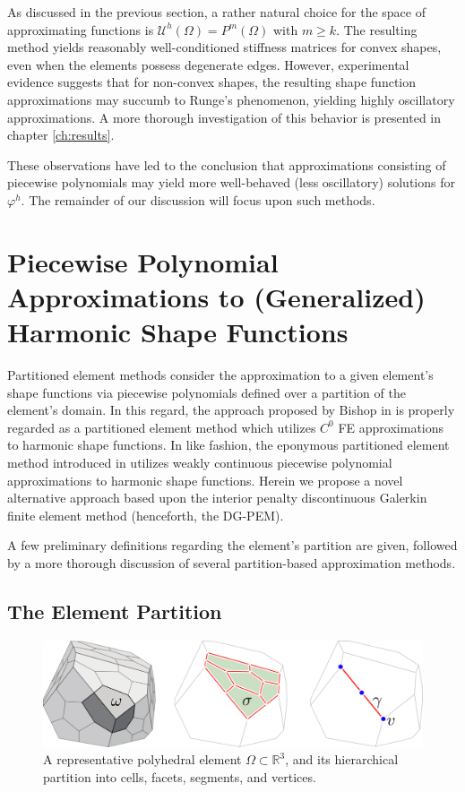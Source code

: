	As discussed in the previous section, a rather natural choice for the space of approximating functions is $\mathcal{U}^h (\Omega) = P^{m} (\Omega)$ with $m \geq k$. The resulting method yields reasonably well-conditioned stiffness matrices for convex shapes, even when the elements possess degenerate edges. However, experimental evidence suggests that for non-convex shapes, the resulting shape function approximations may succumb to Runge's phenomenon, yielding highly oscillatory approximations. A more thorough investigation of this behavior is presented in chapter \ref{ch:results}.
	
	These observations have led to the conclusion that approximations consisting of piecewise polynomials may yield more well-behaved (less oscillatory) solutions for $\varphi^h$. The remainder of our discussion will focus upon such methods.
	
\section{Piecewise Polynomial Approximations to (Generalized) Harmonic Shape Functions}

Partitioned element methods consider the approximation to a given element's shape functions via piecewise polynomials defined over a partition of the element's domain. In this regard, the approach proposed by Bishop in \cite{Bishop:14} is properly regarded as a partitioned element method which utilizes $C^0$ FE approximations to harmonic shape functions. In like fashion, the eponymous partitioned element method introduced in \cite{Rashid:12} utilizes weakly continuous piecewise polynomial approximations to harmonic shape functions. Herein we propose a novel alternative approach based upon the interior penalty discontinuous Galerkin finite element method (henceforth, the DG-PEM).

A few preliminary definitions regarding the element's partition are given, followed by a more thorough discussion of several partition-based approximation methods.

\subsection*{The Element Partition}

\begin{figure} [!ht]
	\centering
	\includegraphics[width = 6.0in]{figures/polyhedron_partition.pdf}
	\caption{A representative polyhedral element $\Omega \subset \mathbb{R}^3$, and its hierarchical partition into cells, facets, segments, and vertices.}
	\label{fig:partitioned_element}
\end{figure}

